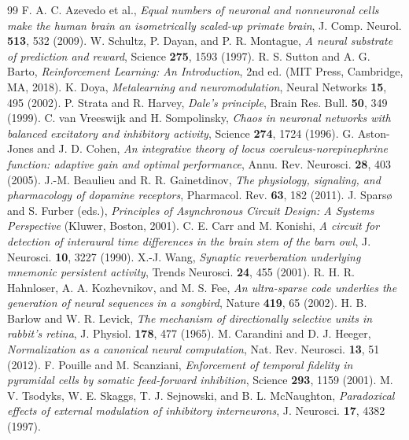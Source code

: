 \begin{thebibliography}{99}
 F. A. C. Azevedo et al., \emph{Equal numbers of neuronal and nonneuronal cells make the human brain an isometrically scaled-up primate brain}, J. Comp. Neurol. \textbf{513}, 532 (2009).
 W. Schultz, P. Dayan, and P. R. Montague, \emph{A neural substrate of prediction and reward}, Science \textbf{275}, 1593 (1997).
 R. S. Sutton and A. G. Barto, \emph{Reinforcement Learning: An Introduction}, 2nd ed. (MIT Press, Cambridge, MA, 2018).
 K. Doya, \emph{Metalearning and neuromodulation}, Neural Networks \textbf{15}, 495 (2002).
 P. Strata and R. Harvey, \emph{Dale's principle}, Brain Res. Bull. \textbf{50}, 349 (1999).
 C. van Vreeswijk and H. Sompolinsky, \emph{Chaos in neuronal networks with balanced excitatory and inhibitory activity}, Science \textbf{274}, 1724 (1996).
 G. Aston-Jones and J. D. Cohen, \emph{An integrative theory of locus coeruleus-norepinephrine function: adaptive gain and optimal performance}, Annu. Rev. Neurosci. \textbf{28}, 403 (2005).
 J.-M. Beaulieu and R. R. Gainetdinov, \emph{The physiology, signaling, and pharmacology of dopamine receptors}, Pharmacol. Rev. \textbf{63}, 182 (2011).
 J. Spars{\o} and S. Furber (eds.), \emph{Principles of Asynchronous Circuit Design: A Systems Perspective} (Kluwer, Boston, 2001).
 C. E. Carr and M. Konishi, \emph{A circuit for detection of interaural time differences in the brain stem of the barn owl}, J. Neurosci. \textbf{10}, 3227 (1990).
 X.-J. Wang, \emph{Synaptic reverberation underlying mnemonic persistent activity}, Trends Neurosci. \textbf{24}, 455 (2001).
 R. H. R. Hahnloser, A. A. Kozhevnikov, and M. S. Fee, \emph{An ultra-sparse code underlies the generation of neural sequences in a songbird}, Nature \textbf{419}, 65 (2002).
 H. B. Barlow and W. R. Levick, \emph{The mechanism of directionally selective units in rabbit's retina}, J. Physiol. \textbf{178}, 477 (1965).
 M. Carandini and D. J. Heeger, \emph{Normalization as a canonical neural computation}, Nat. Rev. Neurosci. \textbf{13}, 51 (2012).
 F. Pouille and M. Scanziani, \emph{Enforcement of temporal fidelity in pyramidal cells by somatic feed-forward inhibition}, Science \textbf{293}, 1159 (2001).
 M. V. Tsodyks, W. E. Skaggs, T. J. Sejnowski, and B. L. McNaughton, \emph{Paradoxical effects of external modulation of inhibitory interneurons}, J. Neurosci. \textbf{17}, 4382 (1997).

\end{thebibliography}
